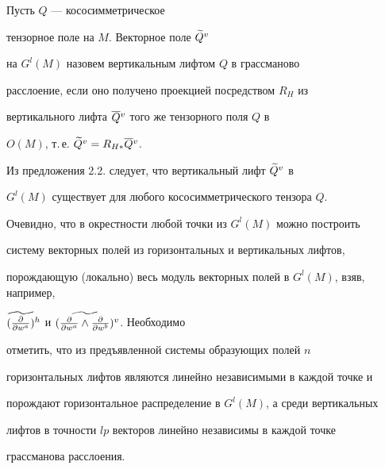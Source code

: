 \begin{defns} Пусть $Q$ --- кососимметрическое


тензорное поле на $M$. Векторное поле $\widetilde {Q}{}^v$


на $G^l(M)$ назовем вертикальным лифтом $Q$ в грассманово


расслоение, если оно получено проекцией посредством $R_H$ из


вертикального лифта $\overline {Q}{}^v$ того же тензорного поля $Q$ в


$O(M)$, т.\,е. $\widetilde {Q}{}^v=R_{H*}\overline {Q}{}^v$.


\end{defns}





Из предложения 2.2. следует, что вертикальный лифт $\widetilde {Q}{}^v$ в


$G^l(M)$ существует для любого кососимметрического тензора $Q$.


Очевидно, что в окрестности любой точки из $G^l(M)$ можно построить


систему векторных полей из горизонтальных и вертикальных лифтов,


порождающую (локально) весь модуль векторных полей в $G^l(M)$, взяв, например,


$\widetilde {(\frac\partial{\partial w^a})}{}^h$ и $\widetilde {(\frac\partial{\partial w^a}\land \frac\partial{\partial w^b})}{}^v$. Необходимо


отметить, что из предъявленной системы образующих полей $n$


горизонтальных лифтов являются линейно независимыми в каждой точке и


порождают горизонтальное распределение в $G^l(M)$, а среди вертикальных


лифтов в точности $lp$ векторов линейно независимы в каждой точке


грассманова расслоения.





